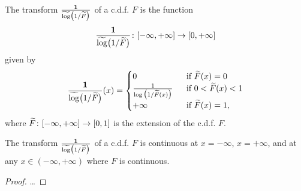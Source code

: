 \begin{definition}
  \label{def:one-div-neg-log-cdf}
  \leanok
  The transform $\frac{\mathbf{1}}{\widetilde{\log} \big( 1 / \widetilde{F} \big)}$ of a c.d.f. $F$ is the function
  \begin{align*}
    \frac{\mathbf{1}}{\widetilde{\log} \big( 1 / \widetilde{F} \big)} \colon [-\infty,+\infty] \to [0,+\infty]
  \end{align*}
  given by
  \begin{align*}
    \frac{\mathbf{1}}{\widetilde{\log} \big( 1 / \widetilde{F} \big)}(x) = \begin{cases}
      0 & \; \text{ if } \widetilde{F}(x) = 0 \\
      \frac{1}{\log \big( 1/\widetilde{F}(x) \big)} & \; \text{ if } 0 < \widetilde{F}(x) < 1 \\
      +\infty & \; \text{ if } \widetilde{F}(x) = 1 ,
      \end{cases}
  \end{align*}
  where $\widetilde{F} \colon [-\infty,+\infty] \to [0,1]$ is the extension of the c.d.f. $F$.
\end{definition}

\begin{lemma}
  \label{lem:one-div-neg-log-cdf-continuity-pts}
  \leanok
  The transform $\frac{\mathbf{1}}{\widetilde{\log} \big( 1 / \widetilde{F} \big)}$ of a c.d.f. $F$ is continuous
  at $x = -\infty$, $x = + \infty$, and at any
  $x \in (-\infty,+\infty)$ where $F$ is continuous.
\end{lemma}
\begin{proof}
  \ldots
\end{proof}
